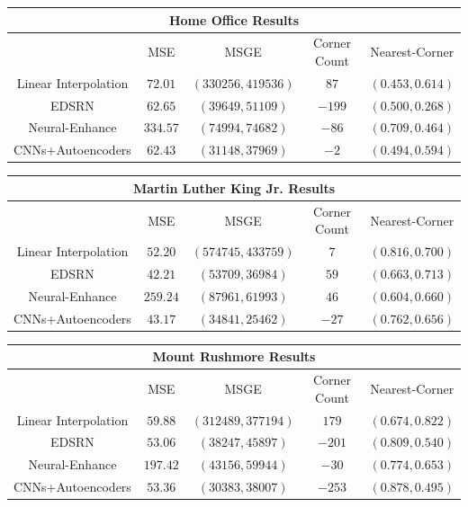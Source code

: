 \documentclass[letterpaper,12pt]{article}
\begin{document}
\begin{center}\begin{tabular}{ |c||c|c|c|c| }
    \hline
    \multicolumn{5}{|c|}{Home Office Results} \\
    \hline
    & MSE & MSGE\* & Corner Count & Nearest-Corner\\
    \hline
    Linear Interpolation & $72.01$ & $(330256, 419536)$ & $87$ & $(0.453, 0.614)$\\
    EDSRN & $62.65$ & $(39649, 51109)$ & $-199$ & $(0.500, 0.268)$\\
    Neural-Enhance & $334.57$ & $(74994, 74682)$ & $-86$ & $(0.709, 0.464)$\\
    CNNs+Autoencoders & $62.43$ & $(31148, 37969)$ & $-2$ & $(0.494, 0.594)$\\
    \hline
\end{tabular}\end{center}

\begin{center}\begin{tabular}{ |c||c|c|c|c| }
    \hline
    \multicolumn{5}{|c|}{Martin Luther King Jr. Results} \\
    \hline
    & MSE & MSGE\* & Corner Count & Nearest-Corner\\
    \hline
    Linear Interpolation & $52.20$ & $(574745, 433759)$ & $7$ & $(0.816, 0.700)$\\
    EDSRN & $42.21$ & $(53709, 36984)$ & $59$ & $(0.663, 0.713)$\\
    Neural-Enhance & $259.24$ & $(87961, 61993)$ & $46$ & $(0.604, 0.660)$\\
    CNNs+Autoencoders & $43.17$ & $(34841, 25462)$ & $-27$ & $(0.762, 0.656)$\\
    \hline
\end{tabular}\end{center}

\begin{center}\begin{tabular}{ |c||c|c|c|c| }
    \hline
    \multicolumn{5}{|c|}{Mount Rushmore Results} \\
    \hline
    & MSE & MSGE\* & Corner Count & Nearest-Corner\\
    \hline
    Linear Interpolation & $59.88$ & $(312489, 377194)$ & $179$ & $(0.674, 0.822)$\\
    EDSRN & $53.06$ & $(38247, 45897)$ & $-201$ & $(0.809, 0.540)$\\
    Neural-Enhance & $197.42$ & $(43156, 59944)$ & $-30$ & $(0.774, 0.653)$\\
    CNNs+Autoencoders & $53.36$ & $(30383, 38007)$ & $-253$ & $(0.878, 0.495)$\\
    \hline
\end{tabular}\end{center}
\end{document}
